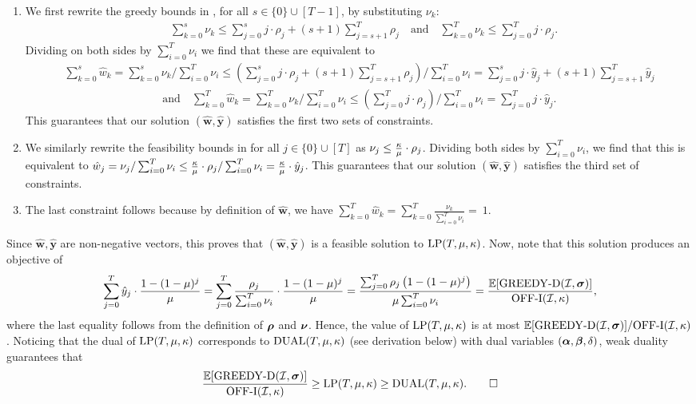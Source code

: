     \begin{enumerate}
      \item We first rewrite the greedy bounds in , for all $s \in \{0\}\cup[T-1]$, by substituting $\nu_k$:
      \begin{align*}
    & \sum_{k=0}^s \nu_k \leq \sum_{j=0}^s j \cdot \rho_j +  (s+1)  \sum_{j=s+1}^{T} \rho_j
    \quad \text{and}\quad
    \sum_{k=0}^T \nu_k \leq \sum_{j=0}^T j \cdot \rho_j.
    \end{align*}
    Dividing on both sides by $\sum_{i=0}^T \nu_i$ we find that these are equivalent to
\begin{align*}
    \sum_{k=0}^s \hat{w}_k = \sum_{k=0}^s \nu_k / \sum_{i=0}^T \nu_i  \leq \left(\sum_{j=0}^s j \cdot \rho_j +  (s+1)  \sum_{j=s+1}^{T} \rho_j\right)/\sum_{i=0}^T \nu_i =\sum_{j=0}^s j \cdot \hat{y}_j +  (s+1)  \sum_{j=s+1}^{T} \hat{y}_j
\end{align*}
\begin{align*}    
    \text{and}\quad
    \sum_{k=0}^T \hat{w}_k = \sum_{k=0}^T \nu_k / \sum_{i=0}^T \nu_i \leq \left( \sum_{j=0}^T j \cdot \rho_j\right)/ \sum_{i=0}^T \nu_i = \sum_{j=0}^T j \cdot \hat{y}_j.
\end{align*}
This guarantees that our solution $(\mathbf{\hat{w}}, \mathbf{\hat{y}})$ satisfies the first two sets of constraints. 
\item We similarly rewrite the feasibility bounds in  for all $j \in \{0\} \cup [T]$ as $\nu_j\leq  \frac{\kappa}{\mu}\cdot \rho_j$. Dividing both sides by $\sum_{i=0}^T \nu_i$, we find that this is equivalent to $\hat{w}_j=\nu_j/\sum_{i=0}^T \nu_i \leq \frac{\kappa}{\mu}\cdot \rho_j/\sum_{i=0}^T \nu_i= \frac{\kappa}{\mu} \cdot \hat{y}_j$. This guarantees that our solution $(\mathbf{\hat{w}}, \mathbf{\hat{y}})$ satisfies the third set of constraints.
\item The last constraint follows because by definition of $\mathbf{\hat{w}}$, we have $\sum_{k=0}^T \hat{w}_k = \sum_{k=0}^T  \frac{\nu_k}{\sum_{i=0}^T \nu_i} = ~1$.
\end{enumerate}
Since $\mathbf{\hat{w}}, \mathbf{\hat{y}}$ are non-negative vectors, this proves that  $(\mathbf{\hat{w}}, \mathbf{\hat{y}})$ is a feasible solution to $\mathrm{LP}(T,\mu, \kappa)$. Now, note that this solution produces an objective of
\begin{equation*}
     \sum_{j=0}^T \hat{y}_j \cdot \frac{1-(1-\mu)^{j}}{\mu} = \sum_{j=0}^T \frac{\rho_j}{\sum_{i=0}^T \nu_i} \cdot \frac{1-(1-\mu)^{j}}{\mu} = \frac{\sum_{j=0}^T \rho_j \left( 1-(1-\mu)^{j} \right)}{\mu \sum_{i=0}^T \nu_i} = \frac{\mathbb E[\mathrm{GREEDY\textrm{-}D}(\mathcal I, \bm{\sigma})]}{\mathrm{\mathrm{OFF}}\textrm{-}\mathrm{I}(\mathcal I,\kappa)},
\end{equation*}
where the last equality follows from the definition of $\bm{\rho}$ and $\bm{\nu}$. Hence, the value of $\mathrm{LP}(T,\mu, \kappa)$ is at most $\mathbb E[\mathrm{GREEDY\textrm{-}D}(\mathcal I, \bm{\sigma})]/\mathrm{\mathrm{OFF}}\textrm{-}\mathrm{I}(\mathcal I,\kappa)$. Noticing that the dual of $\mathrm{LP}(T,\mu, \kappa)$ corresponds to $\mathrm{DUAL}(T, \mu, \kappa)$ (see derivation below) with dual variables $(\bm{\alpha}, \bm{\beta}, \delta)$, weak duality guarantees that
\begin{equation*}
     \frac{\mathbb E[\greedy(\inst, \sigmabf)]}{\offIkappa} \geq \LP \geq \DLP. \hfill\Halmos
\end{equation*}

